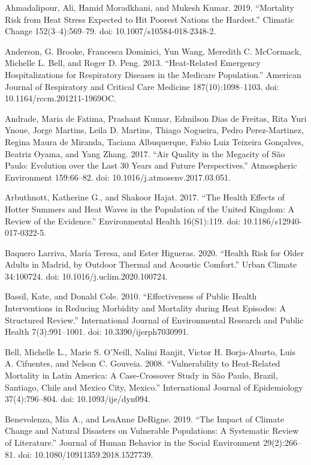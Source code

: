 \documentclass[12pt]{article}
\begin{document}
Ahmadalipour, Ali, Hamid Moradkhani, and Mukesh Kumar. 2019. ``Mortality
Risk from Heat Stress Expected to Hit Poorest Nations the Hardest.''
Climatic Change 152(3--4):569--79. doi: 10.1007/s10584-018-2348-2.

Anderson, G. Brooke, Francesca Dominici, Yun Wang, Meredith C.
McCormack, Michelle L. Bell, and Roger D. Peng. 2013. ``Heat-Related
Emergency Hospitalizations for Respiratory Diseases in the Medicare
Population.'' American Journal of Respiratory and Critical Care Medicine
187(10):1098--1103. doi: 10.1164/rccm.201211-1969OC.

Andrade, Maria de Fatima, Prashant Kumar, Edmilson Dias de Freitas, Rita
Yuri Ynoue, Jorge Martins, Leila D. Martins, Thiago Nogueira, Pedro
Perez-Martinez, Regina Maura de Miranda, Taciana Albuquerque, Fabio Luiz
Teixeira Gonçalves, Beatriz Oyama, and Yang Zhang. 2017. ``Air Quality
in the Megacity of São Paulo: Evolution over the Last 30 Years and
Future Perspectives.'' Atmospheric Environment 159:66--82. doi:
10.1016/j.atmosenv.2017.03.051.

Arbuthnott, Katherine G., and Shakoor Hajat. 2017. ``The Health Effects
of Hotter Summers and Heat Waves in the Population of the United
Kingdom: A Review of the Evidence.'' Environmental Health 16(S1):119.
doi: 10.1186/s12940-017-0322-5.

Baquero Larriva, María Teresa, and Ester Higueras. 2020. ``Health Risk
for Older Adults in Madrid, by Outdoor Thermal and Acoustic Comfort.''
Urban Climate 34:100724. doi: 10.1016/j.uclim.2020.100724.

Bassil, Kate, and Donald Cole. 2010. ``Effectiveness of Public Health
Interventions in Reducing Morbidity and Mortality during Heat Episodes:
A Structured Review.'' International Journal of Environmental Research
and Public Health 7(3):991--1001. doi: 10.3390/ijerph7030991.

Bell, Michelle L., Marie S. O'Neill, Nalini Ranjit, Victor H.
Borja-Aburto, Luis A. Cifuentes, and Nelson C. Gouveia. 2008.
``Vulnerability to Heat-Related Mortality in Latin America: A
Case-Crossover Study in São Paulo, Brazil, Santiago, Chile and Mexico
City, Mexico.'' International Journal of Epidemiology 37(4):796--804.
doi: 10.1093/ije/dyn094.

Benevolenza, Mia A., and LeaAnne DeRigne. 2019. ``The Impact of Climate
Change and Natural Disasters on Vulnerable Populations: A Systematic
Review of Literature.'' Journal of Human Behavior in the Social
Environment 29(2):266--81. doi: 10.1080/10911359.2018.1527739.
\end{document}
